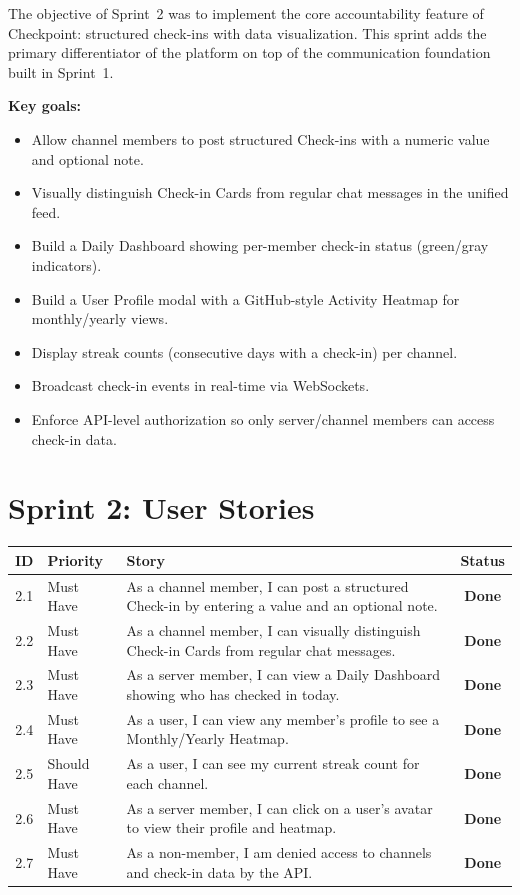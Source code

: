 \documentclass[11pt]{article}
\begin{document}
The objective of Sprint~2 was to implement the core accountability feature of Checkpoint: structured check-ins with data visualization. This sprint adds the primary differentiator of the platform on top of the communication foundation built in Sprint~1.

\textbf{Key goals:}
\begin{itemize}[leftmargin=1.5em]
    \item Allow channel members to post structured Check-ins with a numeric value and optional note.
    \item Visually distinguish Check-in Cards from regular chat messages in the unified feed.
    \item Build a Daily Dashboard showing per-member check-in status (green/gray indicators).
    \item Build a User Profile modal with a GitHub-style Activity Heatmap for monthly/yearly views.
    \item Display streak counts (consecutive days with a check-in) per channel.
    \item Broadcast check-in events in real-time via WebSockets.
    \item Enforce API-level authorization so only server/channel members can access check-in data.
\end{itemize}

\section{Sprint 2: User Stories}

\begin{center}
\begin{tabularx}{\textwidth}{@{}clXc@{}}
\toprule
\textbf{ID} & \textbf{Priority} & \textbf{Story} & \textbf{Status} \\
\midrule
2.1 & Must Have & As a channel member, I can post a structured Check-in by entering a value and an optional note. & \textbf{Done} \\
2.2 & Must Have & As a channel member, I can visually distinguish Check-in Cards from regular chat messages. & \textbf{Done} \\
2.3 & Must Have & As a server member, I can view a Daily Dashboard showing who has checked in today. & \textbf{Done} \\
2.4 & Must Have & As a user, I can view any member's profile to see a Monthly/Yearly Heatmap. & \textbf{Done} \\
2.5 & Should Have & As a user, I can see my current streak count for each channel. & \textbf{Done} \\
2.6 & Must Have & As a server member, I can click on a user's avatar to view their profile and heatmap. & \textbf{Done} \\
2.7 & Must Have & As a non-member, I am denied access to channels and check-in data by the API. & \textbf{Done} \\
\bottomrule
\end{tabularx}
\end{center}
\end{document}
